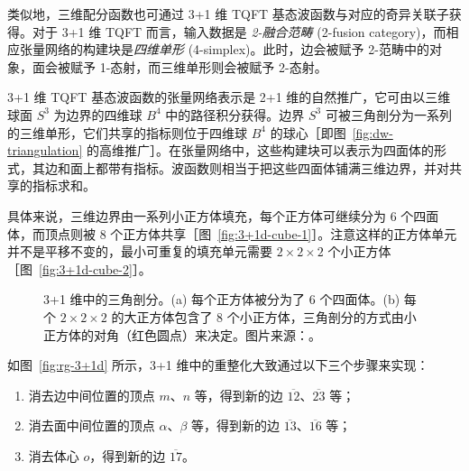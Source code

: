 类似地，三维配分函数也可通过 3+1 维 TQFT 基态波函数与对应的奇异关联子获得。对于 3+1 维 TQFT 而言，输入数据是 \emph{2-融合范畴} (2-fusion category)\cite{lan2018classification,lan2019classification,johnson2021dimensional,johnson2022classification}，而相应张量网络的构建块是\emph{四维单形} (4-simplex)。此时，边会被赋予 2-范畴中的对象，面会被赋予 1-态射，而三维单形则会被赋予 2-态射。

3+1 维 TQFT 基态波函数的张量网络表示是 2+1 维的自然推广，它可由以三维球面 $S^3$ 为边界的四维球 $B^4$ 中的路径积分获得。边界 $S^3$ 可被三角剖分为一系列的三维单形，它们共享的指标则位于四维球 $B^4$ 的球心［即图~\ref{fig:dw-triangulation} 的高维推广］。在张量网络中，这些构建块可以表示为四面体的形式，其边和面上都带有指标。波函数则相当于把这些四面体铺满三维边界，并对共享的指标求和。

具体来说，三维边界由一系列小正方体填充，每个正方体可继续分为 6 个四面体，而顶点则被 8 个正方体共享［图~\ref{fig:3+1d-cube-1}］\cite{delcamp2021tensor}。注意这样的正方体单元并不是平移不变的，最小可重复的填充单元需要 $2\times2\times2$ 个小正方体［图~\ref{fig:3+1d-cube-2}］。

\begin{figure}[htb]
  \centering
   \quad
  \caption[3+1 维中的三角剖分]{3+1 维中的三角剖分。(a) 每个正方体被分为了 6 个四面体。(b) 每个 $2\times2\times2$ 的大正方体包含了 8 个小正方体，三角剖分的方式由小正方体的对角（红色圆点）来决定。图片来源：\parencite{chen2022exact}。}
\end{figure}

如图~\ref{fig:rg-3+1d} 所示，3+1 维中的重整化大致通过以下三个步骤来实现：

\begin{enumerate}
  \item 消去边中间位置的顶点 $m$、$n$ 等，得到新的边 $\overline{12}$、$\overline{23}$ 等；
  \item 消去面中间位置的顶点 $\alpha$、$\beta$ 等，得到新的边 $\overline{13}$、$\overline{16}$ 等；
  \item 消去体心 $o$，得到新的边 $\overline{17}$。
\end{enumerate}

